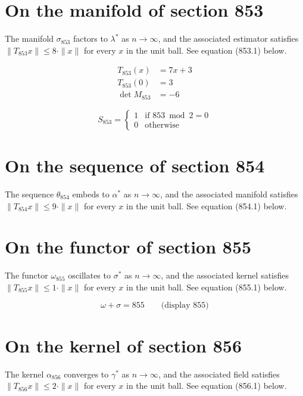 \documentclass{article}
\begin{document}
\section{On the manifold of section 853}
The manifold $\sigma_{853}$ factors to $\lambda^{*}$ as $n \to \infty$,
and the associated estimator satisfies $\|T_{853} x\| \leq 8 \cdot \|x\|$
for every $x$ in the unit ball. See equation (853.1) below.

\begin{align}
T_{853}(x) &= 7 x + 3 \\
T_{853}(0) &= 3 \\
\det M_{853} &= -6
\end{align}

\begin{equation}
S_{853} = \begin{cases} 1 & \text{if } 853 \bmod 2 = 0 \\ 0 & \text{otherwise} \end{cases}
\end{equation}

\section{On the sequence of section 854}
The sequence $\theta_{854}$ embeds to $\alpha^{*}$ as $n \to \infty$,
and the associated manifold satisfies $\|T_{854} x\| \leq 9 \cdot \|x\|$
for every $x$ in the unit ball. See equation (854.1) below.

\section{On the functor of section 855}
The functor $\omega_{855}$ oscillates to $\sigma^{*}$ as $n \to \infty$,
and the associated kernel satisfies $\|T_{855} x\| \leq 1 \cdot \|x\|$
for every $x$ in the unit ball. See equation (855.1) below.

$$
\omega + \sigma = 855 \qquad \text{(display 855)}
$$

\section{On the kernel of section 856}
The kernel $\alpha_{856}$ converges to $\gamma^{*}$ as $n \to \infty$,
and the associated field satisfies $\|T_{856} x\| \leq 2 \cdot \|x\|$
for every $x$ in the unit ball. See equation (856.1) below.
\end{document}
